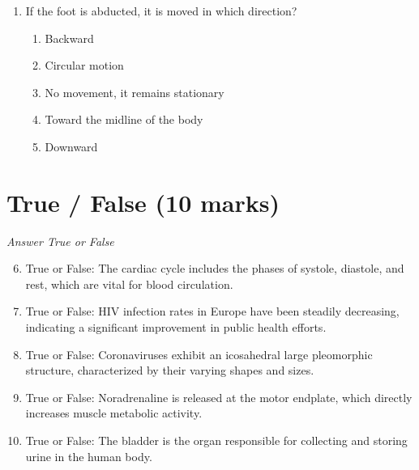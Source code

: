 \documentclass[12pt]{article}
\begin{document}
\begin{enumerate}[label=\arabic*.]
\begin{enumerate}[label=(\alph*)]
    \item Fat conducts electricity better than muscle
    \item Fat contains more electrolytes than muscle
    \item Muscle weighs more than fat
    \item Muscle is denser than fat
    \item Fat is denser than muscle
\end{enumerate}
\item If the foot is abducted, it is moved in which direction?
\begin{enumerate}[label=(\alph*)]
    \item Backward
    \item Circular motion
    \item No movement, it remains stationary
    \item Toward the midline of the body
    \item Downward
\end{enumerate}
\end{enumerate}

\section*{True / False (10 marks)}
\textit{Answer True or False}
\begin{enumerate}[label=\arabic*.]
\setcounter{enumi}{5}
\item True or False: The cardiac cycle includes the phases of systole, diastole, and rest, which are vital for blood circulation.
\item True or False: HIV infection rates in Europe have been steadily decreasing, indicating a significant improvement in public health efforts.
\item True or False: Coronaviruses exhibit an icosahedral large pleomorphic structure, characterized by their varying shapes and sizes.
\item True or False: Noradrenaline is released at the motor endplate, which directly increases muscle metabolic activity.
\item True or False: The bladder is the organ responsible for collecting and storing urine in the human body.
\end{enumerate}
\end{document}
